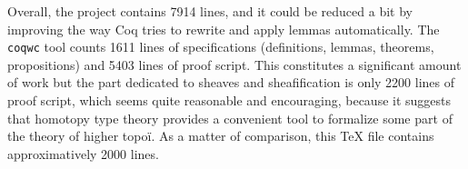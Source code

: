 \documentclass[preprint,9pt,numbers]{sigplanconf}
\DeclareMathOperator{\HProp}{HProp}
\DeclareMathOperator{\IsHProp}{IsHProp}
\DeclareMathOperator{\id}{id}
\begin{document}

Overall, %
the project
contains 7914 lines, and it could be reduced a bit by improving the
way Coq tries to rewrite and apply lemmas automatically. 
The \texttt{coqwc} tool counts 1611 lines of specifications
(definitions, lemmas, theorems, propositions) and 5403 lines of proof
script.
%
This constitutes a significant amount of work but the part dedicated
to sheaves and sheafification is only 2200 lines of proof script,
which seems quite reasonable and encouraging, because it suggests
that homotopy type theory provides a convenient tool to formalize some
part of the theory of higher topoï. As a matter of comparison, this
\TeX\xspace file contains approximatively 2000 lines.

\end{document}
